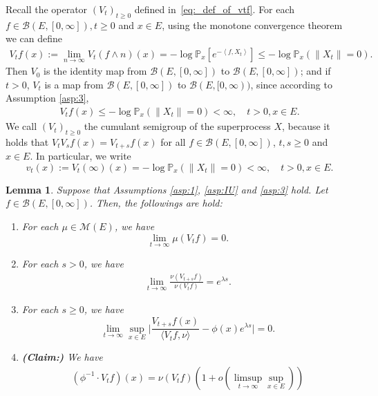 \documentclass[12pt,a4paper]{amsart}
\numberwithin{equation}{section}
\theoremstyle{plain}
\newtheorem{lem}[thm]{Lemma}
\theoremstyle{definition}
\begin{document}
Recall the operator $(V_t)_{t\geq 0}$ defined in~\eqref{eq:_def_of_vtf}.
For each $f\in \mathcal B(E, [0,\infty]),t\geq 0$ and $x\in E$, using the monotone convergence theorem we can define
\begin{align}
\label{eq:Vtf_is_finite}
  V_tf(x)
  := \lim_{n\to \infty}V_t(f\wedge n)(x)
  = - \log \mathbb P_x[e^{-\left\langle f, X_t \right\rangle}]
  \leq -\log \mathbb P_x(\|X_t\| = 0).
\end{align}
Then $V_0$ is the identity map from $\mathcal B(E,[0,\infty])$ to $\mathcal B(E,[0,\infty])$; and if $t > 0$, $V_t$ is a map from $\mathcal B(E,[0,\infty])$ to $\mathcal B(E, [0,\infty))$, since according to Assumption \ref{asp:3},
\begin{align}
V_tf(x) \leq - \log \mathbb P_x(\|X_t\| = 0 ) < \infty, 
\quad t >0, x\in E.
\end{align}
We call $(V_t)_{t\geq 0}$ the cumulant semigroup of the superprocess $X$, because it holds that $V_tV_sf(x) = V_{t+s}f(x)$ for all $f\in \mathcal B(E,[0,\infty])$, $t,s \geq 0$ and $x\in E$. 
In particular, we write
\[
	v_t(x):= V_t(\infty)(x)= -\log \mathbb P_x(\| X_t\| = 0) < \infty,
  \quad t > 0, x\in E.
\]
\begin{lem}
\label{lem:asmptotic_of_Vtf}
  Suppose that Assumptions \ref{asp:1}, \ref{asp:IU} and \ref{asp:3} hold. 
  Let $f\in \mathcal B(E, [0,\infty])$.
  Then, the followings are hold:
  \begin{enumerate}
  \item \label{subVtf_vanish}
    For each $\mu \in \mathcal M(E)$, we have
    \[
      \lim_{t\rightarrow\infty} \mu( V_tf)=0.
    \]
   \item \label{lem:extinct_2_1}
For each $s>0$, we have
     \begin{align}
       \lim_{t\to \infty} \frac{ \nu( V_{t+s}f) }{ \nu(V_t f) } 
= e^{\lambda s}.
     \end{align}
  \item \label{lem:extinct:3}
    For each $s\geq 0$, we have
    \begin{equation} \label{eq:ont_point_ratio_limit}
      \lim_{t\to \infty} \sup_{x\in E}\Big|\frac{V_{t+s}f(x)}{\langle V_tf,\nu\rangle } - \phi(x)e^{\lambda s} \Big|
      =0.
    \end{equation}
  \item 
    {\bf (Claim:)} We have
    \begin{align}
      (\phi^{-1} \cdot V_tf)(x) = \nu(V_tf) \left( 1+ o(\limsup_{t\to \infty} \sup_{x\in E}) \right)
    \end{align} 
  \end{enumerate}
\end{lem}
\end{document}
